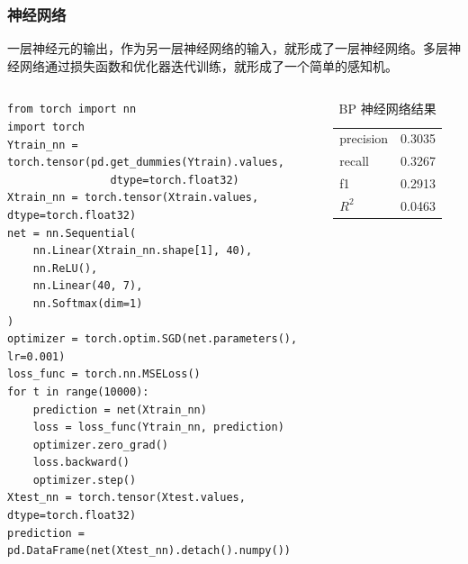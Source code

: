 \documentclass[mathserif,envcountsect,fontset=mac]{ctexbeamer}
\begin{document}
\begin{frame}[fragile]
    \frametitle{神经网络}
    一层神经元的输出，作为另一层神经网络的输入，就形成了一层神经网络。多层神经网络通过损失函数和优化器迭代训练，就形成了一个简单的感知机。

    \begin{columns}
        \tiny\begin{verbatim}
from torch import nn
import torch
Ytrain_nn = torch.tensor(pd.get_dummies(Ytrain).values, 
                dtype=torch.float32)
Xtrain_nn = torch.tensor(Xtrain.values, dtype=torch.float32)
net = nn.Sequential(
    nn.Linear(Xtrain_nn.shape[1], 40),
    nn.ReLU(),
    nn.Linear(40, 7),
    nn.Softmax(dim=1)
)
optimizer = torch.optim.SGD(net.parameters(), lr=0.001)
loss_func = torch.nn.MSELoss()
for t in range(10000):
    prediction = net(Xtrain_nn)
    loss = loss_func(Ytrain_nn, prediction)
    optimizer.zero_grad()
    loss.backward()
    optimizer.step()
Xtest_nn = torch.tensor(Xtest.values, dtype=torch.float32)
prediction = pd.DataFrame(net(Xtest_nn).detach().numpy())           
        \end{verbatim}
        \begin{table}
            \caption{BP 神经网络结果}
            \begin{tabular}{ll}
                precision & 0.3035 \\
                recall    & 0.3267 \\
                f1        & 0.2913 \\
                \(R^2\)   & 0.0463 \\
            \end{tabular}
            \label{BP}
        \end{table}
    \end{columns}
\end{frame}
\end{document}
